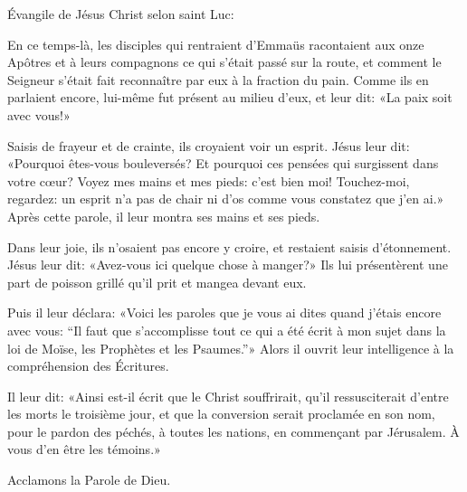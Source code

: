 \indent{} Évangile de Jésus Christ selon saint Luc:

En ce temps-là, les disciples qui rentraient d’Emmaüs racontaient aux onze Apôtres et à leurs compagnons ce qui s’était passé sur la route, et comment le Seigneur s’était fait reconnaître par eux à la fraction du pain. Comme ils en parlaient encore, lui-même fut présent au milieu d’eux, et leur dit: «La paix soit avec vous!»

Saisis de frayeur et de crainte, ils croyaient voir un esprit. Jésus leur dit: «Pourquoi êtes-vous bouleversés? Et pourquoi ces pensées qui surgissent dans votre cœur? Voyez mes mains et mes pieds: c’est bien moi! Touchez-moi, regardez: un esprit n’a pas de chair ni d’os comme vous constatez que j’en ai.» Après cette parole, il leur montra ses mains et ses pieds.

Dans leur joie, ils n’osaient pas encore y croire, et restaient saisis d’étonnement. Jésus leur dit: «Avez-vous ici quelque chose à manger?» Ils lui présentèrent une part de poisson grillé qu’il prit et mangea devant eux.

Puis il leur déclara: «Voici les paroles que je vous ai dites quand j’étais encore avec vous: “Il faut que s’accomplisse tout ce qui a été écrit à mon sujet dans la loi de Moïse, les Prophètes et les Psaumes.”» Alors il ouvrit leur intelligence à la compréhension des Écritures.

Il leur dit: «Ainsi est-il écrit que le Christ souffrirait, qu’il ressusciterait d’entre les morts le troisième jour, et que la conversion serait proclamée en son nom, pour le pardon des péchés, à toutes les nations, en commençant par Jérusalem. À vous d’en être les témoins.»

Acclamons la Parole de Dieu.